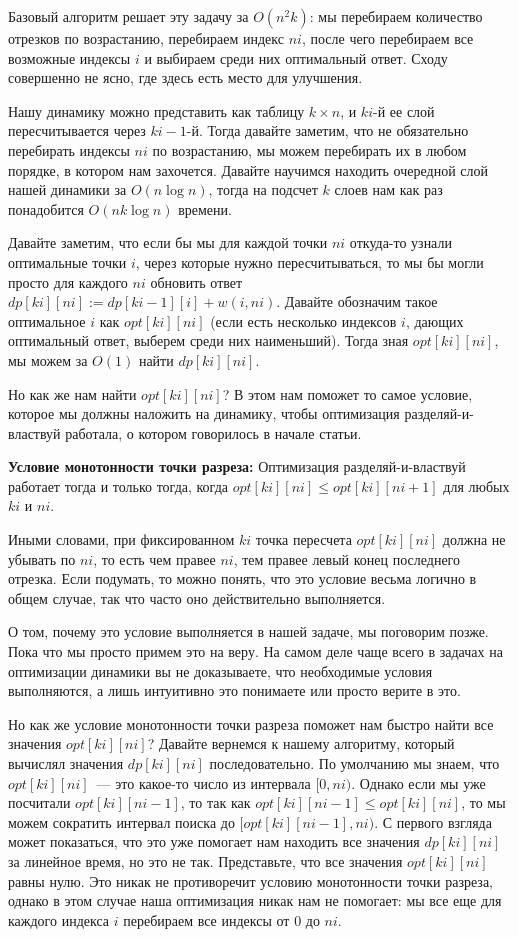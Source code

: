 Базовый алгоритм решает эту задачу за $O(n^2 k)$: мы перебираем количество отрезков по возрастанию, перебираем индекс $ni$, после чего перебираем все возможные индексы $i$ и выбираем среди них оптимальный ответ. Сходу совершенно не ясно, где здесь есть место для улучшения.

Нашу динамику можно представить как таблицу $k \times n$, и $ki$-й ее слой пересчитывается через $ki-1$-й. Тогда давайте заметим, что не обязательно перебирать индексы $ni$ по возрастанию, мы можем перебирать их в любом порядке, в котором нам захочется. Давайте научимся находить очередной слой нашей динамики за $O(n \log n)$, тогда на подсчет $k$ слоев нам как раз понадобится $O(n k \log n)$ времени.

Давайте заметим, что если бы мы для каждой точки $ni$ откуда-то узнали оптимальные точки $i$, через которые нужно пересчитываться, то мы бы могли просто для каждого $ni$ обновить ответ $dp[ki][ni] := dp[ki - 1][i] + w(i, ni)$. Давайте обозначим такое оптимальное $i$ как $opt[ki][ni]$ (если есть несколько индексов $i$, дающих оптимальный ответ, выберем среди них наименьший). Тогда зная $opt[ki][ni]$, мы можем за $O(1)$ найти $dp[ki][ni]$.

Но как же нам найти $opt[ki][ni]$? В этом нам поможет то самое условие, которое мы должны наложить на динамику, чтобы оптимизация разделяй-и-властвуй работала, о котором говорилось в начале статьи.

\textbf{Условие монотонности точки разреза:} Оптимизация разделяй-и-властвуй работает тогда и только тогда, когда $opt[ki][ni] \le opt[ki][ni + 1]$ для любых $ki$ и $ni$.

Иными словами, при фиксированном $ki$ точка пересчета $opt[ki][ni]$ должна не убывать по $ni$, то есть чем правее $ni$, тем правее левый конец последнего отрезка. Если подумать, то можно понять, что это условие весьма логично в общем случае, так что часто оно действительно выполняется.

О том, почему это условие выполняется в нашей задаче, мы поговорим позже. Пока что мы просто примем это на веру. На самом деле чаще всего в задачах на оптимизации динамики вы не доказываете, что необходимые условия выполняются, а лишь интуитивно это понимаете или просто верите в это.

Но как же условие монотонности точки разреза поможет нам быстро найти все значения $opt[ki][ni]$? Давайте вернемся к нашему алгоритму, который вычислял значения $dp[ki][ni]$ последовательно. По умолчанию мы знаем, что $opt[ki][ni]$~--- это какое-то число из интервала $[0, ni)$. Однако если мы уже посчитали $opt[ki][ni - 1]$, то так как $opt[ki][ni - 1] \le opt[ki][ni]$, то мы можем сократить интервал поиска до $[opt[ki][ni - 1], ni)$. С первого взгляда может показаться, что это уже помогает нам находить все значения $dp[ki][ni]$ за линейное время, но это не так. Представьте, что все значения $opt[ki][ni]$ равны нулю. Это никак не противоречит условию монотонности точки разреза, однако в этом случае наша оптимизация никак нам не помогает: мы все еще для каждого индекса $i$ перебираем все индексы от $0$ до $ni$.

